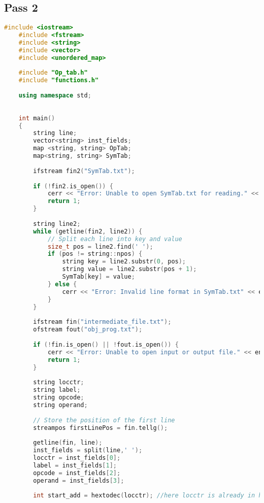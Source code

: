 \documentclass[12pt]{article}
\begin{document}
\subsection{Pass 2}
\begin{lstlisting}[language=C++, caption={Pass 2 - Object Code Generator}]
    #include <iostream>
    #include <fstream>
    #include <string>
    #include <vector>
    #include <unordered_map>
    
    #include "Op_tab.h"
    #include "functions.h"
    
    using namespace std;
    
    
    int main()
    {
        string line;
        vector<string> inst_fields;
        map <string, string> OpTab;
        map<string, string> SymTab;
    
        ifstream fin2("SymTab.txt");
    
        if (!fin2.is_open()) {
            cerr << "Error: Unable to open SymTab.txt for reading." << endl;
            return 1;
        }
          
        string line2;
        while (getline(fin2, line2)) {
            // Split each line into key and value
            size_t pos = line2.find(' ');
            if (pos != string::npos) {
                string key = line2.substr(0, pos);
                string value = line2.substr(pos + 1);
                SymTab[key] = value;
            } else {
                cerr << "Error: Invalid line format in SymTab.txt" << endl;
            }
        }
    
        ifstream fin("intermediate_file.txt");
        ofstream fout("obj_prog.txt");
    
        if (!fin.is_open() || !fout.is_open()) {
            cerr << "Error: Unable to open input or output file." << endl;
            return 1;
        }
    
        string locctr;
        string label;
        string opcode;
        string operand;
    
        // Store the position of the first line
        streampos firstLinePos = fin.tellg();
    
        getline(fin, line);
        inst_fields = split(line,' ');
        locctr = inst_fields[0];
        label = inst_fields[1];
        opcode = inst_fields[2];
        operand = inst_fields[3];
    
        int start_add = hextodec(locctr); //here locctr is already in hex
    

\end{lstlisting}
\end{document}
